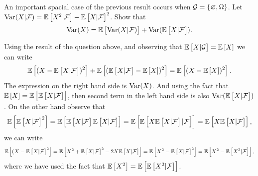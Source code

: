 \begin{problem}
	An important spacial case of the previous result occurs when $ \mathcal{G} = \set{\emptyset, \Omega} $. Let $ \Var(X|\mathcal{F}) = \E{X^2|\mathcal{F}} - \E{X|\mathcal{F}}^2  $. Show that 
	\[ \Var(X) = \E{\Var(X|\mathcal{F})} + \Var(\E{X|\mathcal{F}}). \]
\end{problem}
\begin{solution}
	Using the result of the question above, and observing that $ \E{X|\mathcal{G}}= \E{X} $ we can write
	\[ \E{(X-\E{X|\mathcal{F}})^2} + \E{(\E{X|\mathcal{F}} - \E{X})^2} = \E{(X-\E{X})^2}. \]
	The expression on the right hand side is $ \Var(X) $. And using the fact that $ \E{X} = \E{\E{X|\mathcal{F}}} $, then second term in the left hand side is also $ \Var(\E{X|\mathcal{F}}) $. On the other hand observe that 
	\[ \E{\E{X|\mathcal{F}}^2} = \E{\E{X|\mathcal{F}}\E{X|\mathcal{F}}} = \E{\E{X\E{X|\mathcal{F}}|\mathcal{F}}} = \E{X\E{X|\mathcal{F}}}, \]
	we can write
	\[ \E{(X-\E{X|\mathcal{F}}^2} = \E{X^2 + \E{X|\mathcal{F}}^2 - 2X\E{X|\mathcal{F}}} = \E{X^2 - \E{X|\mathcal{F}}^2} = \E{X^2 - \E{X^2|\mathcal{F}}}, \]
	where we have used the fact that $ \E{X^2} = \E{\E{X^2|\mathcal{F}}} $.
\end{solution}
